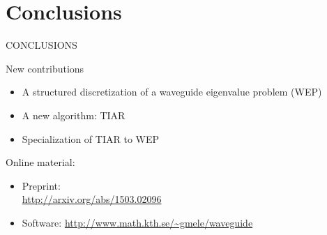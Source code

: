 \documentclass{beamer}
\newcommand{\mycite}[1]{$[$#1$]$}
\begin{document}
\section{Conclusions}
\begin{frame}
 \begin{center}
    \fontsize{20}{24}\selectfont CONCLUSIONS
\end{center}

\begin{block}{New contributions}
  \begin{itemize}
    \item A structured discretization of a waveguide eigenvalue problem (WEP)
    \item A new algorithm: TIAR
    \item Specialization of TIAR to WEP
  \end{itemize}
\end{block}
\medskip
Online material:
\begin{itemize}
  \item Preprint: \\\url{http://arxiv.org/abs/1503.02096}
  \item Software: \url{http://www.math.kth.se/~gmele/waveguide}
\end{itemize}
\end{frame}


% 
\end{document}
